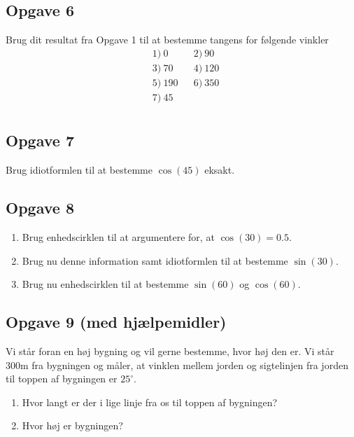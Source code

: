 \subsection*{Opgave 6}
Brug dit resultat fra Opgave 1 til at bestemme tangens for følgende vinkler
\begin{align*}
&1) \ 0  &&2) \ 90   \\
&3) \ 70   &&4) \ 120  \\
&5) \ 190 &&6) \ 350   \\
&7) \ 45     \\
\end{align*}


\subsection*{Opgave 7}
Brug idiotformlen til at bestemme $\cos(45)$ eksakt.

\subsection*{Opgave 8}
\begin{enumerate}[label=\roman*)]
\item Brug enhedscirklen til at argumentere for, at $\cos(30) = 0.5$.
\item Brug nu denne information samt idiotformlen til at bestemme $\sin(30)$.
\item Brug nu enhedscirklen til at bestemme $\sin(60)$ og $\cos(60)$. 

\end{enumerate}


\subsection*{Opgave 9 (med hjælpemidler)}
Vi står foran en høj bygning og vil gerne bestemme, hvor høj den er. Vi står 300m fra bygningen og måler, at vinklen mellem jorden og sigtelinjen fra jorden til toppen af bygningen er $25^\circ$.
\begin{enumerate}[label=\roman*)]
\item Hvor langt er der i lige linje fra os til toppen af bygningen?
\item Hvor høj er bygningen?
\end{enumerate}

